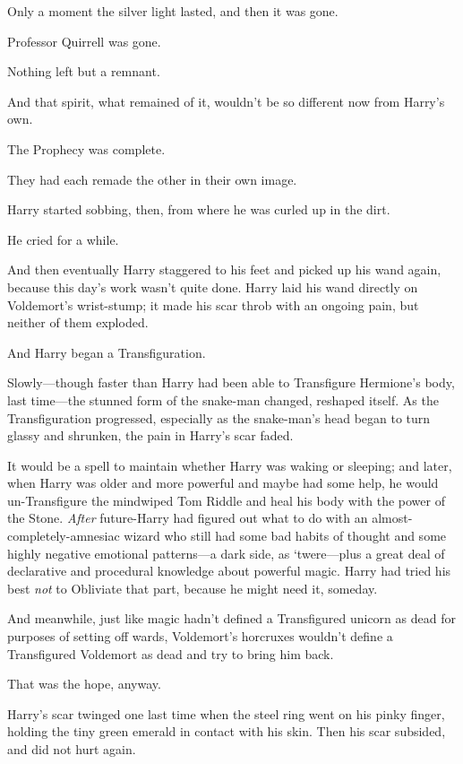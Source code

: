 Only a moment the silver light lasted, and then it was gone.

Professor Quirrell was gone.

Nothing left but a remnant.

And that spirit, what remained of it, wouldn't be so different now from Harry's
own.

The Prophecy was complete.

They had each remade the other in their own image.

Harry started sobbing, then, from where he was curled up in the dirt.

He cried for a while.

And then eventually Harry staggered to his feet and picked up his wand again,
because this day's work wasn't quite done.
\sbreak
Harry laid his wand directly on Voldemort's wrist-stump; it made his scar throb
with an ongoing pain, but neither of them exploded.

And Harry began a Transfiguration.

Slowly—though faster than Harry had been able to Transfigure Hermione's body,
last time—the stunned form of the snake-man changed, reshaped itself. As the
Transfiguration progressed, especially as the snake-man's head began to turn
glassy and shrunken, the pain in Harry's scar faded.

It would be a spell to maintain whether Harry was waking or sleeping; and
later, when Harry was older and more powerful and maybe had some help, he would
un-Transfigure the mindwiped Tom Riddle and heal his body with the power of the
Stone. \emph{After} future-Harry had figured out what to do with an
almost-completely-amnesiac wizard who still had some bad habits of thought and
some highly negative emotional patterns—a dark side, as `twere—plus a great
deal of declarative and procedural knowledge about powerful magic. Harry had
tried his best \emph{not} to Obliviate that part, because he might need it,
someday.

And meanwhile, just like magic hadn't defined a Transfigured unicorn as dead
for purposes of setting off wards, Voldemort's horcruxes wouldn't define a
Transfigured Voldemort as dead and try to bring him back.

That was the hope, anyway.

Harry's scar twinged one last time when the steel ring went on his pinky
finger, holding the tiny green emerald in contact with his skin. Then his scar
subsided, and did not hurt again.

